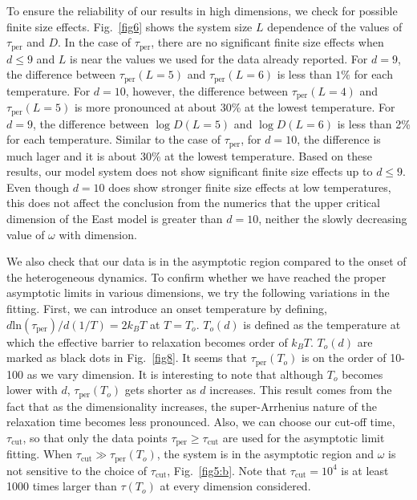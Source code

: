 \documentclass[showpacs,pre,aps,twocolumn,superscriptaddress]{revtex4-1}
\begin{document}
To ensure the reliability of our results in high dimensions, we check for possible finite size effects.
Fig.~\ref{fig6} shows the system size $L$ dependence of the values of $\tau_{\text{per}}$ and $D$.
In the case of $\tau_{\text{per}}$, there are no significant finite size effects when $d \leq 9$ and $L$ is near the values we used for the data already reported.
For $d=9$, the difference between $\tau_{\text{per}}(L=5)$ and $\tau_{\text{per}}(L=6)$ is less than $1\%$ for each temperature.
For $d=10$, however, the difference between $\tau_{\text{per}}(L=4)$ and $\tau_{\text{per}}(L=5)$ is more pronounced at about 30\% at the lowest temperature.
For $d=9$, the difference between $\log D(L=5)$ and $\log D(L=6)$ is less than 2\% for each temperature.
Similar to the case of $\tau_{\text{per}}$, for $d=10$, the difference is much lager and it is about 30\% at the lowest temperature.
Based on these results, our model system does not show significant finite size effects up to $d \leq 9$.
Even though $d=10$ does show stronger finite size effects at low temperatures, this does not affect the conclusion from the numerics that the upper critical dimension of the East model is greater than $d=10$, neither the slowly decreasing value of $\omega$ with dimension.

We also check that our data is in the asymptotic region compared to the onset of the heterogeneous dynamics.
To confirm whether we have reached the proper asymptotic limits in various dimensions,
we try the following variations in the fitting.
First, we can introduce an onset temperature by defining, $d\text{ln}(\tau_{\text{per}})/d(1/T)=2k_B T$ at $T=T_o$.
$T_o(d)$ is defined as the temperature at which the effective barrier to relaxation becomes order of $k_B T$.
$T_o(d)$ are marked as black dots in Fig.~\ref{fig8}.
It seems that $\tau_{\text{per}}(T_o)$ is on the order of 10-100 as we vary dimension.
It is interesting to note that although $T_o$ becomes lower with $d$, $\tau_{\text{per}}(T_o)$ gets shorter as $d$ increases.
This result comes from the fact that as the dimensionality increases, the super-Arrhenius nature of the relaxation time becomes less pronounced.
Also, we can choose our cut-off time, $\tau_{\text{cut}}$, so that only the data points $\tau_{\text{per}} \geq \tau_{\text{cut}}$
are used for the asymptotic limit fitting.
When $\tau_{\text{cut}}\gg \tau_{\text{per}}(T_o)$,
the system is in the asymptotic region and $\omega$ is not sensitive to the choice of $\tau_{\text{cut}}$,
Fig.~\ref{fig5:b}.
Note that $\tau_{\text{cut}}=10^4$ is at least 1000 times larger than $\tau(T_o)$ at every dimension considered.
\end{document}
